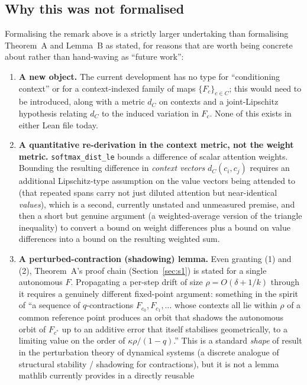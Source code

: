 \documentclass[11pt]{article}
\begin{document}
\subsection{Why this was not formalised}

Formalising the remark above is a strictly larger undertaking than
formalising Theorem~A and Lemma~B as stated, for reasons that are worth being
concrete about rather than hand-waving as ``future work'':

\begin{enumerate}
\item \textbf{A new object.} The current development has no type for
  ``conditioning context'' or for a context-indexed family of maps
  $\{F_c\}_{c\in C}$; this would need to be introduced, along with a metric
  $d_C$ on contexts and a joint-Lipschitz hypothesis relating $d_C$ to the
  induced variation in $F_c$. None of this exists in either Lean file today.
\item \textbf{A quantitative re-derivation in the context metric, not the
  weight metric.} \texttt{softmax\_dist\_le} bounds a difference of scalar
  attention weights. Bounding the resulting difference in \emph{context
  vectors} $d_C(c_i, c_j)$ requires an additional Lipschitz-type assumption on
  the value vectors being attended to (that repeated spans carry not just
  diluted attention but near-identical \emph{values}), which is a second,
  currently unstated and unmeasured premise, and then a short but genuine
  argument (a weighted-average version of the triangle inequality) to convert
  a bound on weight differences plus a bound on value differences into a
  bound on the resulting weighted sum.
\item \textbf{A perturbed-contraction (shadowing) lemma.} Even granting (1)
  and (2), Theorem~A's proof chain (Section~\ref{sec:s1}) is stated for a
  single autonomous $F$. Propagating a per-step drift of size $\rho =
  O(\delta+1/k)$ through it requires a genuinely different fixed-point
  argument: something in the spirit of ``a sequence of $q$-contractions
  $F_{c_0}, F_{c_1}, \dots$ whose contexts all lie within $\rho$ of a common
  reference point produces an orbit that shadows the autonomous orbit of
  $F_{c^\ast}$ up to an additive error that itself stabilises geometrically,
  to a limiting value on the order of $\kappa\rho/(1-q)$.'' This is a standard
  \emph{shape} of result in the perturbation theory of dynamical systems (a
  discrete analogue of structural stability / shadowing for contractions),
  but it is not a lemma mathlib currently provides in a directly reusable

\end{enumerate}
\end{document}
